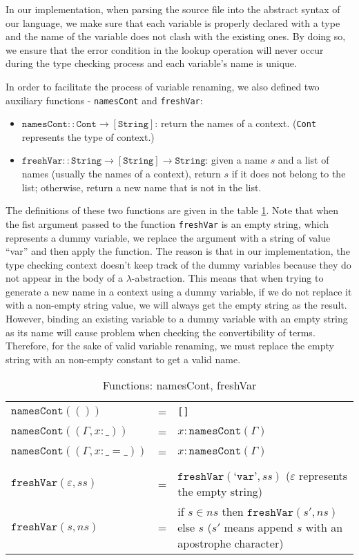 \documentclass{article}
\theoremstyle{remark}
\begin{document}
In our implementation, when parsing the source file into the abstract syntax of our language, we make sure that each variable is properly declared with a type and the name of the variable does not clash with the existing ones. By doing so, we ensure that the error condition in the lookup operation will never occur during the type checking process and each variable's name is unique.

In order to facilitate the process of variable renaming, we also defined two auxiliary functions - \texttt{namesCont} and \texttt{freshVar}:
\begin{itemize}
  \item $\texttt{namesCont} :: \texttt{Cont} \to [\texttt{String}]$: return the names of a context. (\texttt{Cont} represents the type of context.)
  \item $\texttt{freshVar} :: \texttt{String} \to [\texttt{String}] \to \texttt{String}$: given a name $s$ and a list of names (usually the names of a context), return $s$ if it does not belong to the list; otherwise, return a new name that is not in the list.
\end{itemize}

The definitions of these two functions are given in the table \ref{tab:var-rename}. Note that when the fist argument passed to the function \texttt{freshVar} is an empty string, which represents a dummy variable, we replace the argument with a string of value ``var'' and then apply the function. The reason is that in our implementation, the type checking context doesn't keep track of the dummy variables because they do not appear in the body of a $\lambda$-abstraction. This means that when trying to generate a new name in a context using a dummy variable, if we do not replace it with a non-empty string value, we will always get the empty string as the result. However, binding an existing variable to a dummy variable with an empty string as its name will cause problem when checking the convertibility of terms. Therefore, for the sake of valid variable renaming, we must replace the empty string with an non-empty constant to get a valid name.  

\begin{table}[h] 
  \centering
  \begin{tabular}{l l p{6cm}}
    $\texttt{namesCont}(())$ & = & \texttt{[]} \\
    $\texttt{namesCont}((\Gamma, x : \_))$ & = & $x : \texttt{namesCont}(\Gamma)$ \\
    $\texttt{namesCont}((\Gamma, x : \_ = \_))$ & = & $x : \texttt{namesCont}(\Gamma)$ \\
    \\ 
    $\texttt{freshVar}(\varepsilon, ss)$ & = & $\texttt{freshVar}(\texttt{`var'}, ss)$ ($\varepsilon$ represents the empty string)\\
    $\texttt{freshVar}(s, ns)$ & = & if $s \in ns$ then $\texttt{freshVar}(s', ns)$ else $s$ ($s'$ means append $s$ with an apostrophe character)
  \end{tabular}
  \caption{Functions: namesCont, freshVar}
  \label{tab:var-rename}
\end{table}
\end{document}
